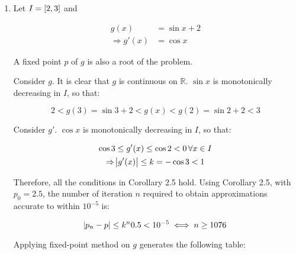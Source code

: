 \documentclass[../../../../Assignments]{subfiles}
\begin{document}
\begin{solution}
    \begin{enumerate}[label = \alph*)]
        \item Let \(I = \interval{2}{3}\) and

            \begin{align*}
                             g(x) &= \sin{x} + 2 \\
                \Rightarrow g'(x) &= \cos{x}
            \end{align*}

            A fixed point \(p\) of \(g\) is also a root of the problem.

            Consider \(g\). It is clear that \(g\) is continuous on
            \(\mathbb{R}\). \(\sin{x}\) is monotonically decreasing in \(I\), so
            that:

            \[2 < g(3) = \sin{3} + 2 < g(x) < g(2) = \sin{2} + 2 < 3\]

            Consider \(g'\). \(\cos{x}\) is monotonically decreasing in \(I\),
            so that:

            \begin{gather*}
                \cos{3} \leq g'(x) \leq \cos{2} < 0 \, \forall x \in I \\
                \Rightarrow \abs{g'(x)} \leq k = - \cos{3} < 1
            \end{gather*}

            Therefore, all the conditions in Corollary 2.5 hold. Using Corollary
            2.5, with \(p_0 = \num{2.5}\), the number of iteration \(n\)
            required to obtain approximations accurate to within \(10^{-5}\) is:

            \[\abs{p_n - p} \leq k^n \num{0.5} < 10^{-5} \iff n \geq 1076\]

            Applying fixed-point method on \(g\) generates the following table:


\end{enumerate}
\end{solution}
\end{document}
